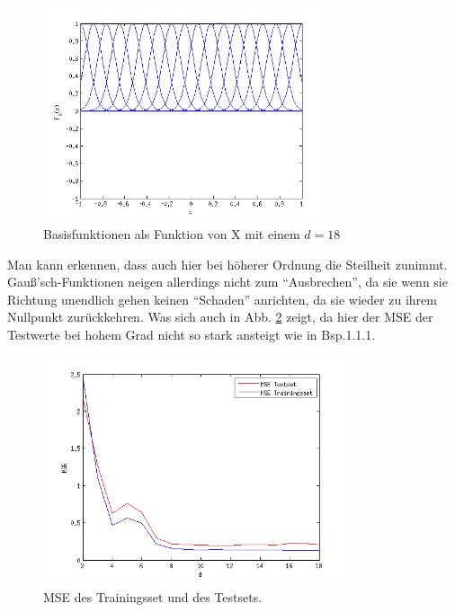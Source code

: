 \begin{figure}[h!]
\begin{center}
 \includegraphics[width=0.75\textwidth]{./figures/RBF_18}
 \caption[Basisfunktionen als Funktion von X, d=18]{Basisfunktionen als Funktion von X mit einem $d=18$}
\label{fig:RBF_18}
\end{center}
\end{figure}

Man kann erkennen, dass auch hier bei höherer Ordnung die Steilheit zunimmt. Gau\ss{}'sch-Funktionen neigen allerdings nicht zum ``Ausbrechen'',
da sie wenn sie Richtung unendlich gehen keinen ``Schaden'' anrichten, da sie wieder zu ihrem Nullpunkt zurückkehren.
Was sich auch in Abb. \ref{fig:RBF_MSE} zeigt, da hier der MSE der Testwerte bei hohem Grad nicht so stark ansteigt wie in Bsp.1.1.1.
 

\begin{figure}[h!]
\begin{center}

 \includegraphics[width=0.8\textwidth]{./figures/RBF_MSE}
 \caption[MSE]{MSE des Trainingsset und des Testsets.}
\label{fig:RBF_MSE}
\end{center}
\end{figure}
\clearpage
